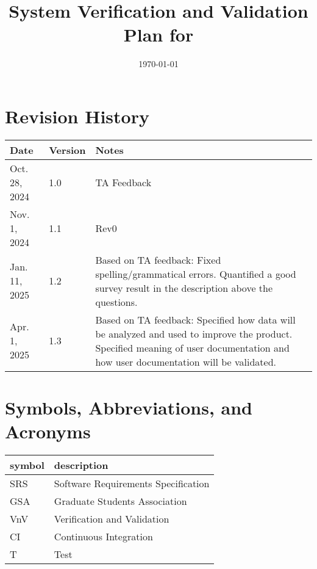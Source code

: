 \documentclass[12pt, titlepage]{article}
\begin{document}
\title{System Verification and Validation Plan for \progname{}} 
\author{\authname}
\date{\today}
	
\maketitle


\section*{Revision History}

\begin{tabularx}{\textwidth}{p{3cm}p{2cm}X}
\toprule {\bf Date} & {\bf Version} & {\bf Notes}\\
\midrule
Oct. 28, 2024 & 1.0 & TA Feedback\\
Nov. 1, 2024 & 1.1 & Rev0\\
Jan. 11, 2025 & 1.2 & Based on TA feedback: Fixed spelling/grammatical errors.
Quantified a good survey result in the description above the questions.\\
Apr. 1, 2025 & 1.3 & Based on TA feedback: Specified how data will be analyzed
and used to improve the product. Specified meaning of user documentation and
how user documentation will be validated.\\
\bottomrule
\end{tabularx}

\newpage

\tableofcontents

\newpage

\section{Symbols, Abbreviations, and Acronyms}

\renewcommand{\arraystretch}{1.2}
\begin{tabular}{l l} 
  \toprule		
  \textbf{symbol} & \textbf{description}\\
  \midrule 
  SRS & Software Requirements Specification\\
  GSA & Graduate Students Association\\
  VnV & Verification and Validation\\
  CI & Continuous Integration\\
  T & Test\\
  \bottomrule
\end{tabular}\\
\end{document}
